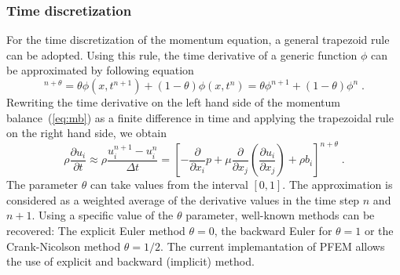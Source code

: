 \documentclass[a4paper]{article}
\newcommand{\pard}[2]{\frac{\partial{#1}}{\partial{#2}}}
\begin{document}
\subsubsection{Time discretization}
For the time discretization of the momentum equation, a general trapezoid rule can be adopted. Using this rule, the time derivative of a generic function $\phi$ can be approximated by following equation
\begin{equation}
[\phi(x,t)]^{n+\theta} = \theta\phi(x,t^{n+1})+(1-\theta)\phi(x,t^n)=\theta\phi^{n+1}+(1-\theta)\phi^n\;.
\end{equation}
Rewriting the time derivative on the left hand side of the momentum balance~(\ref{eq:mb}) as a finite difference in time and applying the trapezoidal rule on the right hand side, we obtain
\begin{equation}\label{eq:momentum-general}
  \rho\pard{u_i}{t} \approx \rho\frac{u^{n+1}_i-u^n_i}{\Delta t}= \left[ - \frac{\partial}{\partial x_i}p+\mu\frac{\partial}{\partial x_j}\left(\frac{\partial u_i}{\partial x_j}\right)+\rho b_i\right]^{n+\theta}\;.
\end{equation}
The parameter $\theta$ can take values from the interval $[0,1]$.  The approximation is considered as a weighted average of the derivative values in the time step $n$ and $n+1$. Using a specific value of the $\theta$ parameter, well-known methods can be recovered: The explicit Euler method $\theta=0$, the backward Euler for $\theta=1$ or the Crank-Nicolson method $\theta=1/2$. The current implemantation of PFEM allows the use of explicit and backward (implicit) method.
\end{document}
